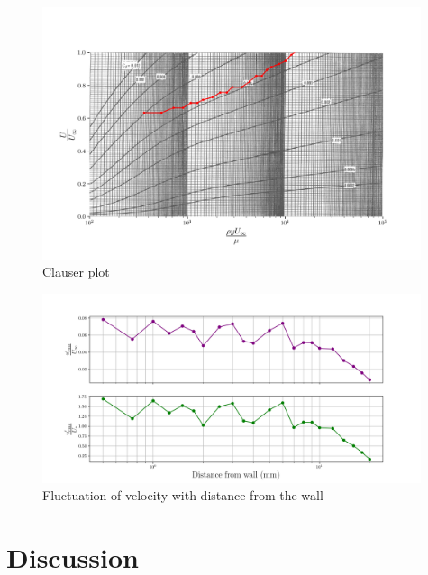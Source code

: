 \documentclass{article}
\begin{document}

\begin{figure}[H]
    \centering
    \includegraphics[width=0.99\textwidth]{clauser_data.png}
    \caption{Clauser plot}
    \label{fig:clauser}
\end{figure}

\begin{figure}[H]
    \centering
    \includegraphics[width=0.99\textwidth]{u_fluctuation.png}
    \caption{Fluctuation of velocity with distance from the wall}
    \label{fig:fluctuation}
\end{figure}


\section{Discussion}


\end{document}
